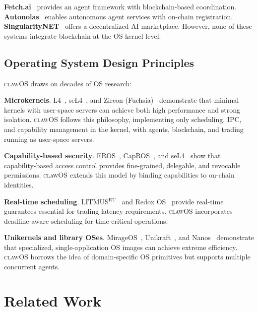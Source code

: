 \documentclass{article}
\newcommand{\clawos}{\textsc{clawOS}}
\begin{document}
\textbf{Fetch.ai}~\cite{fetchai2024} provides an agent framework with blockchain-based coordination. \textbf{Autonolas}~\cite{autonolas2024} enables autonomous agent services with on-chain registration. \textbf{SingularityNET}~\cite{goertzel2017singularitynet} offers a decentralized AI marketplace. However, none of these systems integrate blockchain at the OS kernel level.

\subsection{Operating System Design Principles}

\clawos{} draws on decades of OS research:

\textbf{Microkernels}. L4~\cite{liedtke1995micro}, seL4~\cite{klein2009sel4}, and Zircon (Fuchsia)~\cite{google2024fuchsia} demonstrate that minimal kernels with user-space servers can achieve both high performance and strong isolation. \clawos{} follows this philosophy, implementing only scheduling, IPC, and capability management in the kernel, with agents, blockchain, and trading running as user-space servers.

\textbf{Capability-based security}. EROS~\cite{shapiro1999eros}, CapROS~\cite{shapiro2006capros}, and seL4~\cite{elkaduwe2008kernel} show that capability-based access control provides fine-grained, delegable, and revocable permissions. \clawos{} extends this model by binding capabilities to on-chain identities.

\textbf{Real-time scheduling}. LITMUS$^{\text{RT}}$~\cite{calandrino2006litmus} and Redox OS~\cite{redox2024} provide real-time guarantees essential for trading latency requirements. \clawos{} incorporates deadline-aware scheduling for time-critical operations.

\textbf{Unikernels and library OSes}. MirageOS~\cite{madhavapeddy2013unikernels}, Unikraft~\cite{kuenzer2021unikraft}, and Nanos~\cite{nanos2024} demonstrate that specialized, single-application OS images can achieve extreme efficiency. \clawos{} borrows the idea of domain-specific OS primitives but supports multiple concurrent agents.

%
%

\section{Related Work}
\label{sec:related}
\end{document}
